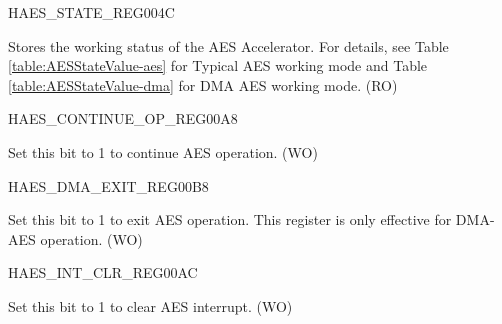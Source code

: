 \begin{register}{H}{AES\_STATE\_REG}{\hexprefix{}004C}\label{regdesc:AESSTATEREG}
%
%
\regnewline%
\begin{regdesc}\begin{reglist}
\item [AES\_STATE] Stores the working status of the AES Accelerator. For details, see Table \ref{table:AESStateValue-aes} for Typical AES working mode and Table  \ref{table:AESStateValue-dma} for DMA AES working mode. (RO)
\end{reglist}\end{regdesc}
\end{register}


\begin{register}{H}{AES\_CONTINUE\_OP\_REG}{\hexprefix{}00A8}\label{regdesc:AESCONTINUEOPREG}
%
%
\regnewline%
\begin{regdesc}\begin{reglist}
\item [AES\_CONTINUE\_OP] Set this bit to 1 to continue AES operation. (WO)
\end{reglist}\end{regdesc}
\end{register}


\begin{register}{H}{AES\_DMA\_EXIT\_REG}{\hexprefix{}00B8}\label{regdesc:AESDMAEXITREG}
%
%
\regnewline%
\begin{regdesc}\begin{reglist}
\item [AES\_DMA\_EXIT] Set this bit to 1 to exit AES operation. This register is only effective for DMA-AES operation. (WO)
\end{reglist}\end{regdesc}
\end{register}


\begin{register}{H}{AES\_INT\_CLR\_REG}{\hexprefix{}00AC}\label{regdesc:AESINTCLRREG}
%
%
\regnewline%
\begin{regdesc}\begin{reglist}
\item [AES\_INT\_CLR] Set this bit to 1 to clear AES interrupt. (WO)
\end{reglist}\end{regdesc}
\end{register}


